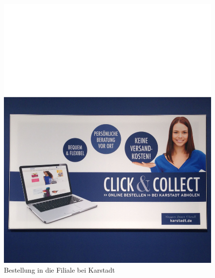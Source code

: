 \begin{minipage}[t]{0.4\textwidth}
\begin{figure}[H]
\begin{center}
\includegraphics[width=\textwidth]{Karstadt-Abholung.jpg}
\caption{Bestellung in die Filiale bei Karstadt}
\label{pic:karstadtab}
\end{center}
\end{figure}
\end{minipage}
\hfill
